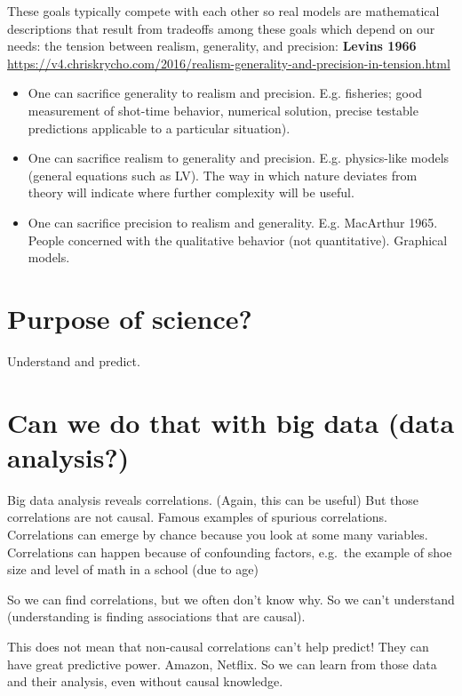\documentclass[
]{book}
\theoremstyle{definition}
\theoremstyle{definition}
\theoremstyle{definition}
\theoremstyle{definition}
\theoremstyle{remark}
\begin{document}
These goals typically compete with each other so real models are mathematical descriptions that result from tradeoffs among these goals which depend on our needs: the tension between realism, generality, and precision:
\textbf{Levins 1966}
\url{https://v4.chriskrycho.com/2016/realism-generality-and-precision-in-tension.html}

\begin{itemize}
\item
  One can sacrifice generality to realism and precision. E.g. fisheries; good measurement of shot-time behavior, numerical solution, precise testable predictions applicable to a particular situation).
\item
  One can sacrifice realism to generality and precision. E.g. physics-like models (general equations such as LV). The way in which nature deviates from theory will indicate where further complexity will be useful.
\item
  One can sacrifice precision to realism and generality. E.g. MacArthur 1965. People concerned with the qualitative behavior (not quantitative). Graphical models.
\end{itemize}

\section{Purpose of science?}\label{purpose-of-science}

Understand and predict.

\section{Can we do that with big data (data analysis?)}\label{can-we-do-that-with-big-data-data-analysis}

Big data analysis reveals correlations. (Again, this can be useful)
But those correlations are not causal.
Famous examples of spurious correlations.
Correlations can emerge by chance because you look at some many variables.
Correlations can happen because of confounding factors, e.g.~the example of shoe size and level of math in a school (due to age)

So we can find correlations, but we often don't know why. So we can't understand (understanding is finding associations that are causal).

This does not mean that non-causal correlations can't help predict! They can have great predictive power. Amazon, Netflix.
So we can learn from those data and their analysis, even without causal knowledge.
\end{document}
